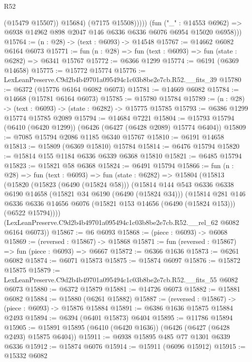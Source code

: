 \begin{lexlean}{R52}
\begin{coremodule}
                    (@15479 @15507))
                  @15684)
                (@7175 @15508)))))
        (fun ("_" : @14553 @6962) =>
        @6938 @14962 @898 @2047 @146 @6336 @6336 @6076 @6954 @15020 @6958)))
@15764 := (n : @28) -> (text : @6093) -> @14548
@15767 := @14662 @6082 @6164 @6073
@15771 := fun (n : @28) => fun (text : @6093) => fun (state : @6282) => @6341 @15767
@15772 := @6366 @1299
@15774 := @6191 (@6369 @14658)
@15775 := @15772 @15774
@15776 := LexLeanPreserve.C9d2b4b49701a095494c1c03b8be2e7cb.R52.__fits_39
@15780 := @6372 (@15776 @6164 @6082 @6073)
@15781 := @14669 @6082
@15784 := @14668 (@15781 @6164 @6073)
@15785 := @15780 @15784
@15789 := (n : @28) -> (text : @6093) -> (state : @6282) -> @15775 @15785
@15793 := @6386 @1299 @15774 @15785 @2089
@15794 := @14684 @7221
@15804 := @15793 @15794 (@6410 (@6420 @1299)) (@6426 (@6427 (@6428 @2089) @15774 @6404))
@15809 := @7085 @15794 @2086 @1185 @6340 @15767
@15810 := @6191 @14658
@15813 := @15809 (@6369 @15810) @15784
@15814 := @6476 @15794
@15820 := @15814 @155 @1184 @6336 @6339 @6368 @15810
@15821 := @6485 @15794
@15823 := @15821 @58 @6368
@15824 := @6491 @15794
@15866 := fun (n : @28) =>
  fun (text : @6093) =>
  fun (state : @6282) =>
  @15804
    (@15813
      (@15820
        (@15823 (@6490 (@15824 @58)))
        (@15814
          @144
          @543
          @6336
          @6338
          @6190
          @14658
          (@15821 @34 @6190 (@6490 (@15824 @34)))
          (@15814
            @281
            @146
            @6336
            @6336
            @14656
            @6076
            (@15821 @153 @14656 (@6490 (@15824 @153)))
            (@6522 @15794))))
      (LexLeanPreserve.C9d2b4b49701a095494c1c03b8be2e7cb.R52.__rel_62 @6082 @6164 @6073))
@15867 := @6 @6093
@15868 := (piece : @6093) -> @6068
@15869 := (reversed : @15867) -> @15868
@15871 := fun (reversed : @15867) => fun (piece : @6093) => @6667
@15872 := @6366 @1636
@15873 := @6261 @6082
@15874 := @6071 @15873
@15875 := @15874 @6097
@15876 := @15872 @15875
@15879 := LexLeanPreserve.C9d2b4b49701a095494c1c03b8be2e7cb.R52.__fits_55 @6082 @6073
@15880 := @6372 @15879
@15881 := @14726 @6073
@15882 := @15881 @6082
@15884 := @15880 (@6261 @15882)
@15887 := (reversed : @15867) -> (piece : @6093) -> @15876 @15884
@15891 := @6386 @1636 @15875 @15884 @2493
@15894 := @6394 (@6401 @15873) @6404
@15895 := @11786 @15894
@15905 := @15891 @15895 (@6410 (@6420 @1636)) (@6426 (@6427 (@6428 @2493) @15875 @6404))
@15911 := @6938 @15895 @485 @77 @1301 @6339 @6336
@15912 := @15874 @6076
@15914 := @15911 (@6096 @15912)
@15915 := @15332 @6082

\end{coremodule}
\end{lexlean}

